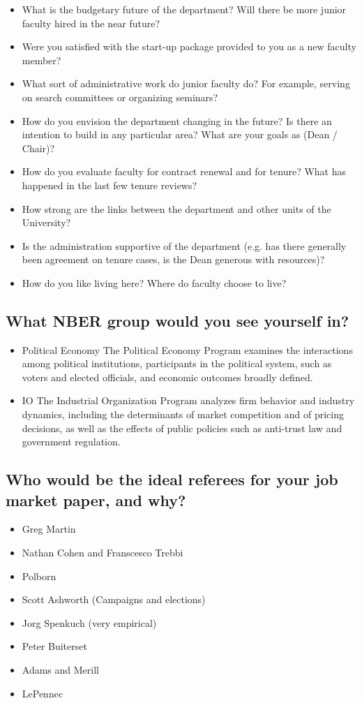 \documentclass[12pt]{article}
\theoremstyle{plain}
\theoremstyle{plain}
\theoremstyle{plain}
\theoremstyle{plain}
\theoremstyle{plain}
\theoremstyle{plain}
\begin{document}
\begin{itemize}
\item What is the budgetary future of the department?
Will there be more junior faculty hired in the near future?
\item Were you satisfied with the start-up package provided to you as a new faculty member?
\item What sort of administrative work do junior faculty do?
For example, serving on search committees or organizing seminars?
\item How do you envision the department changing in the future?
Is there an intention to build in any particular area? What are your goals as (Dean / Chair)?
\item How do you evaluate faculty for contract renewal and for tenure? What has happened in the last few tenure reviews?
\item How strong are the links between the department and other units of the University?
\item Is the administration supportive of the department (e.g. has there generally been agreement on tenure cases, is the Dean generous with resources)?
\item How do you like living here? Where do faculty choose to live?
\end{itemize}

\subsection{What NBER group would you see yourself in?}
\label{sec:orgfc852f3}
\begin{itemize}
\item Political Economy
The Political Economy Program examines the interactions among political institutions, participants in the political system, such as voters and elected officials, and economic outcomes broadly defined.
\item IO
The Industrial Organization Program analyzes firm behavior and industry dynamics, including the determinants of market competition and of pricing decisions, as well as the effects of public policies such as anti-trust law and government regulation.
\end{itemize}


\subsection{Who would be the ideal referees for your job market paper, and why?}
\label{sec:org709ce04}
\begin{itemize}
\item Greg Martin
\item Nathan Cohen and Franscesco Trebbi
\item Polborn
\item Scott Ashworth (Campaigns and elections)
\item Jorg Spenkuch (very empirical)
\item Peter Buiterset
\item Adams and Merill
\item LePennec
\end{itemize}
\end{document}
